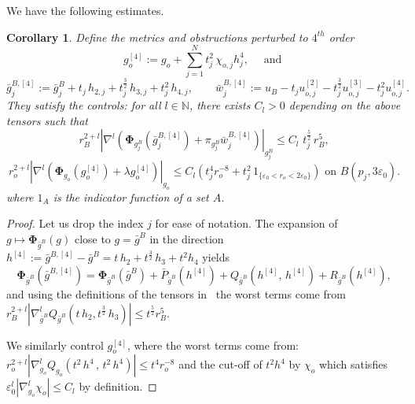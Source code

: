 \documentclass[11pt,reqno]{amsart}
\numberwithin{equation}{section}
\newtheorem{corollary}[thm]{Corollary}
\theoremstyle{definition}
\theoremstyle{remark}
\begin{document}
We have the following estimates.
\begin{corollary}\label{cor: est Phi regions}
    Define the metrics and obstructions perturbed to $4^{th}$ order
    \begin{equation}\label{eq:approx on Mo}
        g_o^{[4]}:= g_o + \sum_{j=1}^N t_j^2\,\chi_{o,j}h^4_j,\quad \text{ and }
    \end{equation}
\begin{equation}\label{eq:approx on bargB}
        \bar{g}^{B,[4]}_j:= \bar{g}^{B}_j+t_j \,h_{2,j}+t_j^\frac32\, h_{3,j}+t_j^2\, h_{4,j}, \qquad \bar{w}^{B,[4]}_j:= u_B - t_j u_{o,j}^{[2]} -t_j^\frac32 u_{o,j}^{[3]}-t_j^2 u_{o,j}^{[4]}.
    \end{equation}
    They satisfy the controls: for all $l\in\mathbb{N}$, there exists $C_l>0$ depending on the above tensors such that
    \begin{equation}\label{eq:control Ric go4}
        r_B^{2+l}\left|\nabla^l\left(\mathbf{\Phi}_{g^B_j}(\bar{g}^{B,[4]}_j) + \pi_{g^B_j}\bar{w}^{B,[4]}_j \right)\right|_{g^B_j} \leqslant C_l\,\,t_j^\frac{5}{2}\,r_B^5,
    \end{equation}
    \begin{equation}\label{eq:control Ric bargB4}
        r_o^{2+l}\left|\nabla^l\left(\mathbf{\Phi}_{g_o}(g_o^{[4]})+\lambda g_o^{[4]}\right)\right|_{g_o} \leqslant C_l \left(t_j^4r_o^{-8} + t_j^2\, 1_{\{\varepsilon_0<r_o<2\varepsilon_0\}}\right) \text{ on } B(p_j,3\varepsilon_0).
    \end{equation}
    where $1_{A}$ is the indicator function of a set $A$.
\end{corollary}
\begin{proof}
    
Let us drop the index $j$ for ease of notation. The expansion of $g\mapsto\mathbf{\Phi}_{\bar{g}^{B}}(g)$ close to $g = \bar{g}^B$ in the direction $h^{[4]}:=\bar{g}^{B,[4]}-\bar{g}^{B} =t\,h_2+t^\frac32\,h_3+t^2h_4$ yields
$$\mathbf{\Phi}_{\bar{g}^{B}}(\bar{g}^{B,[4]}) = \mathbf{\Phi}_{\bar{g}^{B}}(\bar{g}^{B}) + \bar{P}_{\bar{g}^{B}}(h^{[4]}) + Q_{\bar{g}^{B}}(h^{[4]},\,h^{[4]}) + R_{\bar{g}^{B}}(h^{[4]}), $$
and using the definitions of the tensors in \ the worst terms come from $r_B^{2+l}|\nabla^l_{\bar{g}^{B}}Q_{\bar{g}^{B}}(t\,h_2,t^\frac32\,h_3)| \leqslant t^{\frac52}r_B^5$. 

We similarly control $g_o^{[4]}$, where the worst terms come from:
$r_o^{2+l}|\nabla^l_{g_o}Q_{g_o}(t^2\,h^4\,,\,t^2\,h^4)| \leqslant t^4r_o^{-8}$
and the cut-off of $t^2h^4$ by $\chi_{o}$ which  satisfies $\varepsilon_0^{l}|\nabla_{g_o}^l\chi_{o}|\leqslant C_l$ by definition.
\end{proof}
\end{document}
